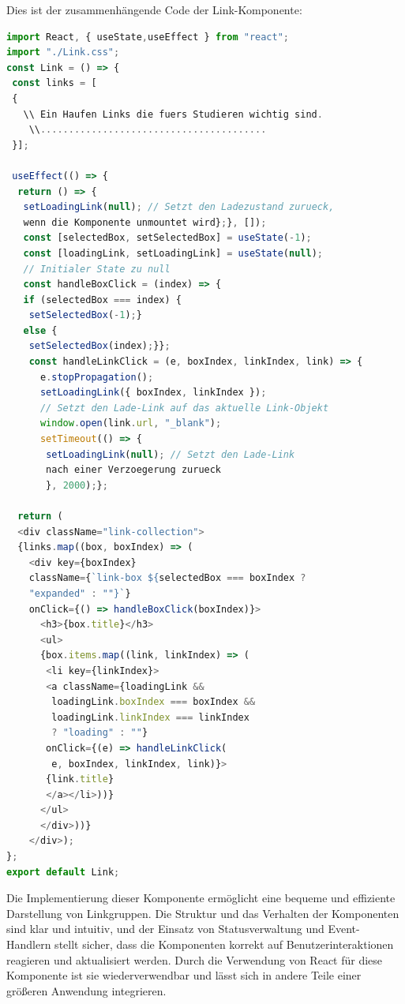 Dies ist der zusammenhängende Code der Link-Komponente:
\begin{lstlisting}[language=JavaScript,
	frame=single,           % Ein Rahmen um den Code
	framexleftmargin=15pt,  % Rahmen link von den Zahlen
	style=algoBericht,
	label={Links-Komponente},
	captionpos=b ,          % Caption unter den Code setzen
	caption={Links-Komponente}]
import React, { useState,useEffect } from "react";
import "./Link.css";
const Link = () => {
 const links = [
 {
   \\ Ein Haufen Links die fuers Studieren wichtig sind.
    \\........................................
 }];

 useEffect(() => {
  return () => {
   setLoadingLink(null); // Setzt den Ladezustand zurueck, 
   wenn die Komponente unmountet wird};}, []);
   const [selectedBox, setSelectedBox] = useState(-1);
   const [loadingLink, setLoadingLink] = useState(null); 
   // Initialer State zu null
   const handleBoxClick = (index) => {
   if (selectedBox === index) {
   	setSelectedBox(-1);} 
   else {
   	setSelectedBox(index);}};
	const handleLinkClick = (e, boxIndex, linkIndex, link) => {
	  e.stopPropagation();
	  setLoadingLink({ boxIndex, linkIndex }); 
	  // Setzt den Lade-Link auf das aktuelle Link-Objekt
	  window.open(link.url, "_blank");
	  setTimeout(() => {
	   setLoadingLink(null); // Setzt den Lade-Link 
	   nach einer Verzoegerung zurueck
       }, 2000);};
   
  return (
  <div className="link-collection">
  {links.map((box, boxIndex) => (
  	<div key={boxIndex}
  	className={`link-box ${selectedBox === boxIndex ? 
  	"expanded" : ""}`}
    onClick={() => handleBoxClick(boxIndex)}>
      <h3>{box.title}</h3>
      <ul>
      {box.items.map((link, linkIndex) => (
       <li key={linkIndex}>
       <a className={loadingLink && 
       	loadingLink.boxIndex === boxIndex && 
       	loadingLink.linkIndex === linkIndex 
       	? "loading" : ""}
       onClick={(e) => handleLinkClick(
       	e, boxIndex, linkIndex, link)}>
       {link.title}
       </a></li>))}
      </ul>
      </div>))}
	</div>);
};
export default Link;

\end{lstlisting}

Die Implementierung dieser Komponente ermöglicht eine bequeme und effiziente Darstellung von Linkgruppen. Die Struktur und das Verhalten der Komponenten sind klar und intuitiv, und der Einsatz von Statusverwaltung und Event-Handlern stellt sicher, dass die Komponenten korrekt auf Benutzerinteraktionen reagieren und aktualisiert werden. Durch die Verwendung von React für diese Komponente ist sie wiederverwendbar und lässt sich in andere Teile einer größeren Anwendung integrieren.
\newpage

